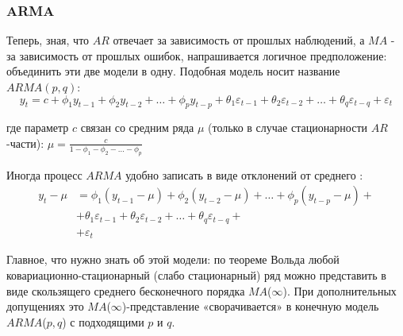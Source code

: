



\subsubsection{ARMA}

Теперь, зная, что $AR$ отвечает за зависимость от прошлых наблюдений, а 
$MA$ - за зависимость от прошлых ошибок, напрашивается логичное предположение: 
объединить эти две модели в одну. Подобная модель носит название $ARMA(p,q)$:
\begin{equation*}
    y_t = c + 
    \phi_1 y_{t-1} + \phi_2 y_{t-2} + \dots + \phi_p y_{t-p} + 
    \theta_1 \varepsilon_{t-1} + \theta_2 \varepsilon_{t-2} + \dots + \theta_q \varepsilon_{t-q} + 
    \varepsilon_t
\end{equation*}

где параметр $c$ связан со средним ряда $\mu$ (только в случае стационарности $AR$-части): 
$\mu = \frac{c}{1 - \phi_1 - \phi_2 - \dots - \phi_p}$

Иногда процесс $ARMA$ удобно записать в виде отклонений от среднего \cite{TSA_Hamilton}:
\begin{align*}
    y_t - \mu &= \phi_1 (y_{t-1} - \mu) + \phi_2 (y_{t-2} - \mu) + \dots + \phi_p (y_{t-p} - \mu) + \\ 
    &+ \theta_1 \varepsilon_{t-1} + \theta_2 \varepsilon_{t-2} + \dots + \theta_q \varepsilon_{t-q} + \\
    &+ \varepsilon_t
\end{align*}

Главное, что нужно знать об этой модели: по теореме Вольда любой ковариационно-стационарный (слабо стационарный) 
ряд можно представить в виде скользящего среднего бесконечного порядка $MA$($\infty$). При дополнительных допущениях 
это $MA$($\infty$)-представление «сворачивается» в
конечную модель $ARMA$(\(p,q\)) с подходящими \(p\) и \(q\).

